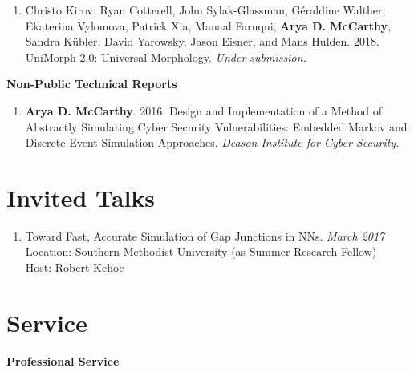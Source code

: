 \documentclass[margin, 10pt]{res} %
\newcommand{\Year}[1]{\emph{#1}}
\begin{document}
\begin{resume}
\begin{enumerate}
\item Christo Kirov, Ryan Cotterell, John Sylak-Glassman, G\'eraldine Walther, Ekaterina Vylomova, Patrick Xia, Manaal Faruqui, \textbf{Arya D. McCarthy}, Sandra K{\"u}bler, David Yarowsky, Jason Eisner, and Mans Hulden. 2018. \href{https://www.overleaf.com/11054329fbzfqmpdhvjh#/41647078/}{UniMorph 2.0: Universal Morphology}. \emph{Under submission.}
\end{enumerate}

\textbf{Non-Public Technical Reports}
\begin{enumerate}[resume]
\item \textbf{Arya D. McCarthy}. 2016. Design and Implementation of a Method of Abstractly Simulating Cyber Security Vulnerabilities: Embedded Markov and Discrete Event Simulation Approaches. \emph{Deason Institute for Cyber Security.}
\end{enumerate}


\section{Invited Talks}
\begin{enumerate}
\item Toward Fast, Accurate Simulation of Gap Junctions in NNs. \hfill \Year{March 2017}\\
Location: Southern Methodist University (as Summer Research Fellow)\\
Host: Robert Kehoe
\end{enumerate}


\section{Service}

\textbf{Professional Service}


\end{resume}
\end{document}
